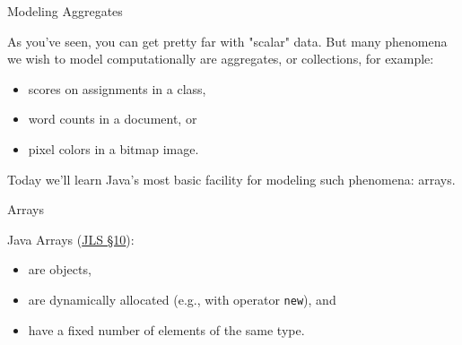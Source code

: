 \documentclass{beamer}
\begin{document}
\begin{frame}
  \titlepage
\end{frame}


\begin{frame}[fragile]{Modeling Aggregates}


As you've seen, you can get pretty far with "scalar" data.  But many phenomena we wish to model computationally are aggregates, or collections, for example:
\begin{itemize}
\item scores on assignments in a class,
\item word counts in a document, or
\item pixel colors in a bitmap image.
\end{itemize}

Today we'll learn Java's most basic facility for modeling such phenomena: arrays.

\end{frame}


\begin{frame}[fragile]{Arrays}


Java Arrays (\href{http://docs.oracle.com/javase/specs/jls/se8/html/jls-10.html}{JLS \S 10}):
\begin{itemize}
\item are objects,
\item are dynamically allocated (e.g., with operator {\tt new}), and
\item have a fixed number of elements of the same type.
\end{itemize}

\end{frame}
\end{document}
